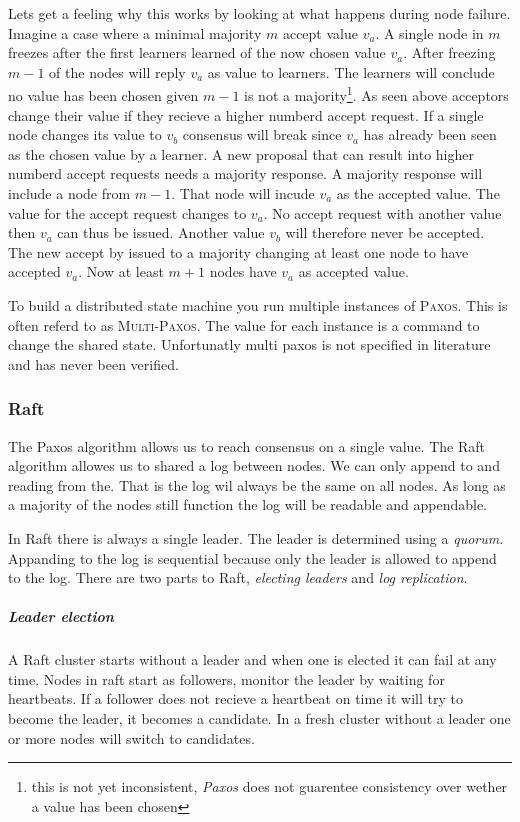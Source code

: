Lets get a feeling why this works by looking at what happens during node failure. Imagine a case where a minimal majority $m$ accept value $v_a$. A single node in $m$ freezes after the first learners learned of the now chosen value $v_a$. After freezing $m-1$ of the nodes will reply $v_a$ as value to learners. The learners will conclude no value has been chosen given $m-1$ is not a majority\footnote{this is not yet inconsistent, \textit{Paxos} does not guarentee consistency over wether a value has been chosen}. As seen above acceptors change their value if they recieve a higher numberd accept request. If a single node changes its value to $v_b$ consensus will break since $v_a$ has already been seen as the chosen value by a learner. A new proposal that can result into higher numberd accept requests needs a majority response. A majority response will include a node from $m-1$. That node will incude $v_a$ as the accepted value. The value for the accept request changes to $v_a$. No accept request with another value then $v_a$ can thus be issued. Another value $v_b$ will therefore never be accepted. The new accept by issued to a majority changing at least one node to have accepted $v_a$. Now at least $m+1$ nodes have $v_a$ as accepted value.

To build a distributed state machine you run multiple instances of \textsc{Paxos}. This is often referd to as \textsc{Multi-Paxos}. The value for each instance is a command to change the shared state. Unfortunatly multi paxos is not specified in literature and has never been verified.

\subsubsection*{Raft}
The Paxos algorithm allows us to reach consensus on a single value. The Raft algorithm allowes us to shared a log between nodes. We can only append to and reading from the. That is the log wil always be the same on all nodes. As long as a majority of the nodes still function the log will be readable and appendable.

In Raft there is always a single leader. The leader is determined using a \textit{quorum}. Appanding to the log is sequential because only the leader is allowed to append to the log. There are two parts to Raft, \textit{electing leaders} and \textit{log replication}.

\subparagraph{Leader election}
A Raft\cite{raft} cluster starts without a leader and when one is elected it can fail at any time. Nodes in raft start as followers, monitor the leader by waiting for heartbeats. If a follower does not recieve a heartbeat on time it will try to become the leader, it becomes a candidate. In a fresh cluster without a leader one or more nodes will switch to candidates.

